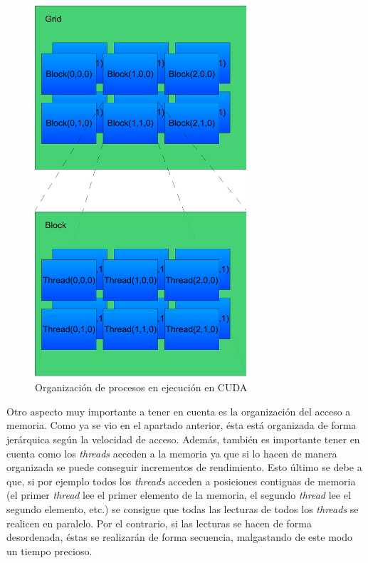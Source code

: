 \begin{figure}
	\centering
	\includegraphics[width=0.7\textwidth]{images/cuda_org.pdf}
	\caption{Organización de procesos en ejecución en CUDA}\label{fig:cudaorg}
\end{figure}

Otro aspecto muy importante a tener en cuenta es la organización del acceso a memoria. Como ya se vio en el apartado anterior, ésta está organizada de forma jerárquica según la velocidad de acceso. Además, también es importante tener en cuenta como los \emph{threads} acceden a la memoria ya que si lo hacen de manera organizada se puede conseguir incrementos de rendimiento. Esto último se debe a que, si por ejemplo todos los \emph{threads} acceden a posiciones contiguas de memoria (el primer \emph{thread} lee el primer elemento de la memoria, el segundo \emph{thread} lee el segundo elemento, etc.) se consigue que todas las lecturas de todos los \emph{threads} se realicen en paralelo. Por el contrario, si las lecturas se hacen de forma desordenada, éstas se realizarán de forma secuencia, malgastando de este modo un tiempo precioso.
 
